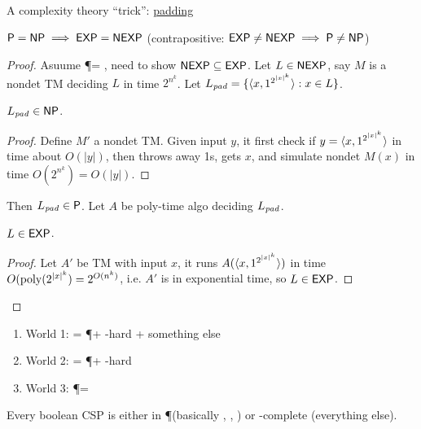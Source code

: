 \documentclass{article}
\begin{document}
A complexity theory ``trick'': \ul{padding}

\begin{theorem}
  \( \P = \NP \implies \EXP = \NEXP \) (contrapositive: \( \EXP \neq \NEXP \implies \P \neq \NP \))
\end{theorem}

\begin{proof}
  Asuume \P = \NP, need to show \(\NEXP \subseteq \EXP\).
  Let \(L \in \NEXP\), say \(M\) is a nondet TM deciding \(L\) in time \(2^{n^k}\).
  Let \(L_{\it pad} = \setof{\encoding{x, 1^{2^{|x|^k}}} : x \in L}\).

  \begin{claim}
    \(L_{\it pad} \in \NP\).
  \end{claim}

  \begin{proof}
    Define \(M'\) a nondet TM. Given input \(y\), it first check if \(y = \encoding{x, 1^{2^{|x|^k}}}\) in time about \(O(|y|)\), then throws away 1s, gets \(x\), and simulate nondet \(M(x)\) in time \(O(2^{n^k}) = O(|y|)\).
  \end{proof}

  Then \(L_{\it pad} \in \P\). Let \(A\) be poly-time algo deciding \(L_{\it pad}\).

  \begin{claim}
    \(L \in \EXP\).
  \end{claim}

  \begin{proof}
    Let \(A'\) be TM with input \(x\), it runs \(A(\encoding{x, 1^{2^{|x|^k}}})\) in time \(O(\poly(2^{|x|^k}) = 2^{O(n^k)}\), i.e. \(A'\) is in exponential time, so \(L \in \EXP\).
  \end{proof}

\end{proof}

\begin{enumerate}
  \item World 1: \NP = \P + \NP-hard + something else
  \item World 2: \NP = \P + \NP-hard
  \item World 3: \P = \NP
\end{enumerate}

\begin{theorem}
  Every boolean CSP is either in \P (basically , , ) or \NP-complete (everything else).
\end{theorem}
\end{document}
